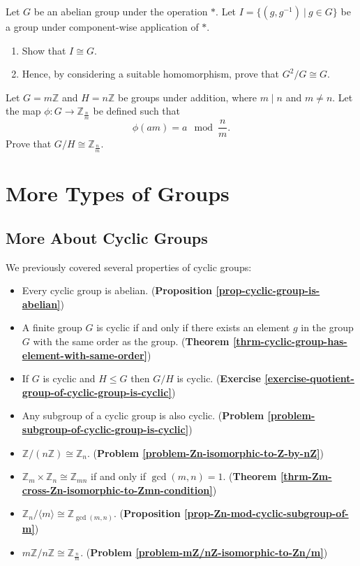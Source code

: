 \begin{problem}\label{problem-cartesian-product-of-group-by-group-isomorphic-to-group}
    Let $G$ be an abelian group under the operation $\ast$. Let $I = \{(g, g^{-1}) \ | \ g \in G\}$ be a group under component-wise application of $\ast$.
    \begin{enumerate}[label=(\roman*)]
        \item Show that $I \cong G$.
        \item Hence, by considering a suitable homomorphism, prove that $G^2/G \cong G$.
    \end{enumerate}
\end{problem}

\begin{problem}\label{problem-mZ/nZ-isomorphic-to-Zn/m}
    Let $G = m\mathbb{Z}$ and $H = n\mathbb{Z}$ be groups under addition, where $m\;|\;n$ and $m \neq n$. Let the map $\phi: G \to \mathbb{Z}_{\frac nm}$ be defined such that
    \[
        \phi(am) = a \mod \frac{n}{m}.
    \]
    Prove that $G/H \cong \mathbb{Z}_{\frac nm}$.
\end{problem}

\chapter{More Types of Groups}
\section{More About Cyclic Groups}
We previously covered several properties of cyclic groups:
\begin{itemize}
    \item Every cyclic group is abelian. (\textbf{Proposition \ref{prop-cyclic-group-is-abelian}})
    \item A finite group $G$ is cyclic if and only if there exists an element $g$ in the group $G$ with the same order as the group. (\textbf{Theorem \ref{thrm-cyclic-group-has-element-with-same-order}})
    \item If $G$ is cyclic and $H \leq G$ then $G/H$ is cyclic. (\textbf{Exercise \ref{exercise-quotient-group-of-cyclic-group-is-cyclic}})
    \item Any subgroup of a cyclic group is also cyclic. (\textbf{Problem \ref{problem-subgroup-of-cyclic-group-is-cyclic}})
    \item $\mathbb{Z} / (n\mathbb{Z}) \cong \mathbb{Z}_n$. (\textbf{Problem \ref{problem-Zn-isomorphic-to-Z-by-nZ}})
    \item $\mathbb{Z}_m \times \mathbb{Z}_n \cong \mathbb{Z}_{mn}$ if and only if $\gcd(m,n) = 1$. (\textbf{Theorem \ref{thrm-Zm-cross-Zn-isomorphic-to-Zmn-condition}})
    \item $\mathbb{Z}_n / \langle m \rangle \cong \mathbb{Z}_{\gcd(m,n)}$. (\textbf{Proposition \ref{prop-Zn-mod-cyclic-subgroup-of-m}})
    \item $m\mathbb{Z} / n\mathbb{Z} \cong \mathbb{Z}_{\frac nm}$. (\textbf{Problem \ref{problem-mZ/nZ-isomorphic-to-Zn/m}})
\end{itemize}

